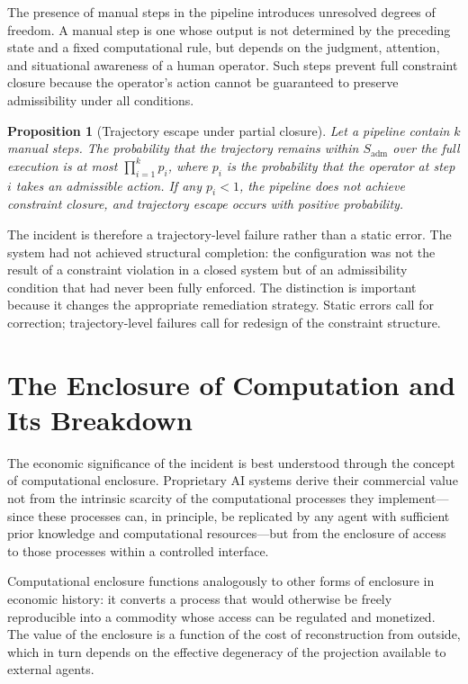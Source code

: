\documentclass[12pt, oneside]{article}
\theoremstyle{plain}
\newtheorem{proposition}[theorem]{Proposition}
\theoremstyle{definition}
\theoremstyle{remark}
\begin{document}
The presence of manual steps in the pipeline introduces unresolved degrees of freedom.
A manual step is one whose output is not determined by the preceding state and a fixed
computational rule, but depends on the judgment, attention, and situational awareness of
a human operator. Such steps prevent full constraint closure because the operator's action
cannot be guaranteed to preserve admissibility under all conditions.

\begin{proposition}[Trajectory escape under partial closure]
Let a pipeline contain $k$ manual steps. The probability that the trajectory remains within
$S_{\text{adm}}$ over the full execution is at most $\prod_{i=1}^k p_i$, where $p_i$ is the
probability that the operator at step $i$ takes an admissible action. If any $p_i < 1$,
the pipeline does not achieve constraint closure, and trajectory escape occurs with positive
probability.
\end{proposition}

The incident is therefore a trajectory-level failure rather than a static error. The system
had not achieved structural completion: the configuration was not the result of a constraint
violation in a closed system but of an admissibility condition that had never been fully
enforced. The distinction is important because it changes the appropriate remediation
strategy. Static errors call for correction; trajectory-level failures call for redesign
of the constraint structure.

\section{The Enclosure of Computation and Its Breakdown}

The economic significance of the incident is best understood through the concept of
computational enclosure. Proprietary AI systems derive their commercial value not from the
intrinsic scarcity of the computational processes they implement---since these processes
can, in principle, be replicated by any agent with sufficient prior knowledge and
computational resources---but from the enclosure of access to those processes within a
controlled interface.

Computational enclosure functions analogously to other forms of enclosure in economic
history: it converts a process that would otherwise be freely reproducible into a commodity
whose access can be regulated and monetized. The value of the enclosure is a function of
the cost of reconstruction from outside, which in turn depends on the effective degeneracy
of the projection available to external agents.
\end{document}
